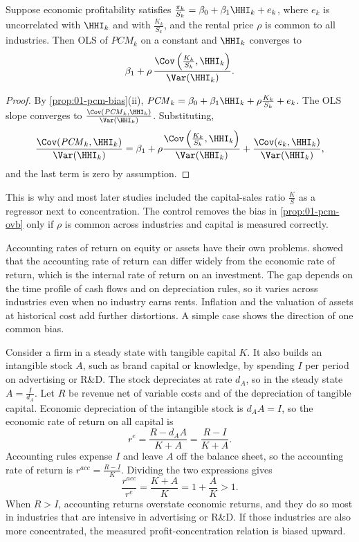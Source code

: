 \begin{corollary}\label{prop:01-pcm-ovb}
Suppose economic profitability satisfies $\frac{\pi_k}{S_k} = \beta_0 + \beta_1 \HHI_k + e_k$, where
$e_k$ is uncorrelated with $\HHI_k$ and with $\frac{K_k}{S_k}$, and the rental price $\rho$ is common to
all industries. Then OLS of $\mathit{PCM}_k$ on a constant and $\HHI_k$ converges to
\[
\beta_1 + \rho \, \frac{\Cov\left(\frac{K_k}{S_k}, \HHI_k\right)}{\Var(\HHI_k)}.
\]
\end{corollary}

\begin{proof}
By \cref{prop:01-pcm-bias}(ii), $\mathit{PCM}_k = \beta_0 + \beta_1 \HHI_k + \rho \frac{K_k}{S_k} + e_k$.
The OLS slope converges to $\frac{\Cov(\mathit{PCM}_k, \HHI_k)}{\Var(\HHI_k)}$. Substituting,
\[
\frac{\Cov(\mathit{PCM}_k, \HHI_k)}{\Var(\HHI_k)}
 = \beta_1 + \rho \frac{\Cov\left(\frac{K_k}{S_k}, \HHI_k\right)}{\Var(\HHI_k)}
   + \frac{\Cov(e_k, \HHI_k)}{\Var(\HHI_k)},
\]
and the last term is zero by assumption.
\end{proof}

This is why \citet{CollinsPreston1969} and most later studies included the capital-sales ratio
$\frac{K}{S}$ as a regressor next to concentration. The control removes the bias in
\cref{prop:01-pcm-ovb} only if $\rho$ is common across industries and capital is measured correctly.

Accounting rates of return on equity or assets have their own problems. \citet{FisherMcGowan1983} showed
that the accounting rate of return can differ widely from the economic rate of return, which is the
internal rate of return on an investment. The gap depends on the time profile of cash flows and on
depreciation rules, so it varies across industries even when no industry earns rents. Inflation and the
valuation of assets at historical cost add further distortions. A simple case shows the direction of
one common bias.

\begin{remark}\label{rem:01-intangibles}
Consider a firm in a steady state with tangible capital $K$. It also builds an intangible stock $A$, such
as brand capital or knowledge, by spending $I$ per period on advertising or R\&D. The stock depreciates
at rate $d_A$, so in the steady state $A = \frac{I}{d_A}$. Let $R$ be revenue net of variable costs and
of the depreciation of tangible capital. Economic depreciation of the intangible stock is $d_A A = I$, so
the economic rate of return on all capital is
\[
r^e = \frac{R - d_A A}{K + A} = \frac{R - I}{K + A}.
\]
Accounting rules expense $I$ and leave $A$ off the balance sheet, so the accounting rate of return is
$r^{acc} = \frac{R - I}{K}$. Dividing the two expressions gives
\[
\frac{r^{acc}}{r^e} = \frac{K + A}{K} = 1 + \frac{A}{K} > 1.
\]
When $R > I$, accounting returns overstate economic returns, and they do so most in industries that are
intensive in advertising or R\&D. If those industries are also more concentrated, the measured profit-concentration relation is
biased upward.
\end{remark}

